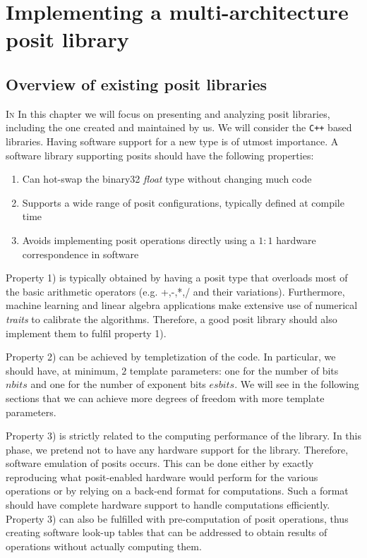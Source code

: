 \chapter{Implementing a multi-architecture posit library}\label{chap:posit_library}


\section{Overview of existing posit libraries}

\lettrine{I}{n} In this chapter we will focus on presenting and analyzing posit libraries, including the one created and maintained by us. We will consider the \texttt{C++} based libraries.
Having software support for a new type is of utmost importance. A software library supporting posits should have the following properties:
\begin{enumerate}
    \item Can hot-swap the binary32  \textit{float} type without changing much code
    \item Supports a wide range of posit configurations, typically defined at compile time
    \item Avoids implementing posit operations directly using a $1:1$ hardware correspondence in software 
\end{enumerate}

Property 1) is typically obtained by having a posit type that overloads most of the basic arithmetic operators (e.g. +,-,*,/ and their variations). Furthermore, machine learning and linear algebra applications make extensive use of numerical \textit{traits} to calibrate the algorithms. Therefore, a good posit library should also implement them to fulfil property 1). 

Property 2) can be achieved by templetization of the code. In particular, we should have, at minimum, $2$ template parameters: one for the number of bits $nbits$ and one for the number of exponent bits $esbits$. We will see  in the following sections that we can achieve more degrees of freedom with more template parameters.

Property 3) is strictly related to the computing performance of the library. In this phase, we pretend not to have any hardware support for the library. Therefore, software emulation of posits occurs. This can be done either by exactly reproducing what posit-enabled hardware would perform for the various operations or by relying on a back-end format for computations. Such a format should have complete hardware support to handle computations efficiently. Property 3) can also be fulfilled with pre-computation of posit operations, thus creating software look-up tables that can be addressed to obtain results of operations without actually computing them.


